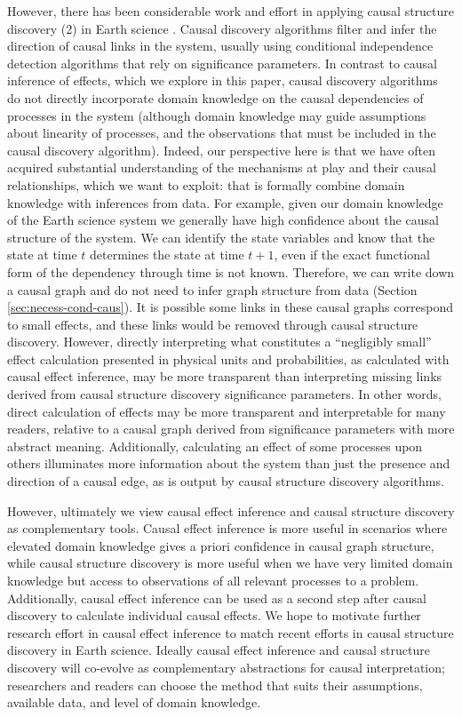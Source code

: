 \documentclass[12pt]{article}
\begin{document}
However, there has been considerable work and effort in applying
causal structure discovery (2) in Earth science
\citep[e.g.,][]{ebert-uphoff2012,
  samarasinghe-casuality,runge-causal-timeseries,runge2019inferring,goodwell-causality-2020}. Causal
discovery algorithms filter and infer the direction of causal links in
the system, usually using conditional independence detection
algorithms that rely on significance parameters. In contrast to causal
inference of effects, which we explore in this paper, causal discovery
algorithms do not directly incorporate domain knowledge on the causal
dependencies of processes in the system (although domain knowledge may
guide assumptions about linearity of processes, and the observations
that must be included in the causal discovery algorithm). Indeed, our
perspective here is that we have often acquired substantial
understanding of the mechanisms at play and their causal
relationships, which we want to exploit: that is formally combine
domain knowledge with inferences from data. For example, given our
domain knowledge of the Earth science system we generally have high
confidence about the causal structure of the system. We can identify
the state variables and know that the state at time \(t\) determines
the state at time \(t+1\), even if the exact functional form of the
dependency through time is not known. Therefore, we can write down a
causal graph and do not need to infer graph structure from data
(Section \ref{sec:necess-cond-caus}). It is possible some links in
these causal graphs correspond to small effects, and these links would
be removed through causal structure discovery. However, directly
interpreting what constitutes a ``negligibly small'' effect
calculation presented in physical units and probabilities, as
calculated with causal effect inference, may be more transparent than
interpreting missing links derived from causal structure discovery
significance parameters. In other words, direct calculation of effects
may be more transparent and interpretable for many readers, relative
to a causal graph derived from significance parameters with more
abstract meaning. Additionally, calculating an effect of some
processes upon others illuminates more information about the system
than just the presence and direction of a causal edge, as is output by
causal structure discovery algorithms.

However, ultimately we view causal effect inference and causal
structure discovery as complementary tools. Causal effect inference is
more useful in scenarios where elevated domain knowledge gives a
priori confidence in causal graph structure, while causal structure
discovery is more useful when we have very limited domain knowledge
but access to observations of all relevant processes to a
problem. Additionally, causal effect inference can be used as a second
step after causal discovery to calculate individual causal effects. We
hope to motivate further research effort in causal effect inference to
match recent efforts in causal structure discovery in Earth
science. Ideally causal effect inference and causal structure
discovery will co-evolve as complementary abstractions for causal
interpretation; researchers and readers can choose the method that
suits their assumptions, available data, and level of domain
knowledge.
\end{document}
